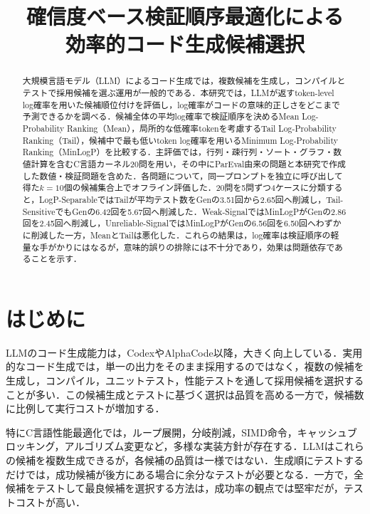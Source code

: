 \documentclass[submit,techrep,noauthor]{ipsj}
\begin{document}
\title{確信度ベース検証順序最適化による\\効率的コード生成候補選択}

\begin{abstract}
大規模言語モデル（LLM）によるコード生成では，複数候補を生成し，コンパイルとテストで採用候補を選ぶ運用が一般的である．本研究では，LLMが返すtoken-level log確率を用いた候補順位付けを評価し，log確率がコードの意味的正しさをどこまで予測できるかを調べる．候補全体の平均log確率で検証順序を決めるMean Log-Probability Ranking（Mean），局所的な低確率tokenを考慮するTail Log-Probability Ranking（Tail），候補中で最も低いtoken log確率を用いるMinimum Log-Probability Ranking（MinLogP）を比較する．主評価では，行列・疎行列・ソート・グラフ・数値計算を含むC言語カーネル20問を用い，その中にParEval由来の問題と本研究で作成した数値・検証問題を含めた．各問題について，同一プロンプトを独立に呼び出して得た$k=10$個の候補集合上でオフライン評価した．20問を5問ずつ4ケースに分類すると，LogP-SeparableではTailが平均テスト数をGenの3.51回から2.65回へ削減し，Tail-SensitiveでもGenの6.42回を5.67回へ削減した．Weak-SignalではMinLogPがGenの2.86回を2.45回へ削減し，Unreliable-SignalではMinLogPがGenの6.56回を6.50回へわずかに削減した一方，MeanとTailは悪化した．これらの結果は，log確率は検証順序の軽量な手がかりにはなるが，意味的誤りの排除には不十分であり，効果は問題依存であることを示す．
\end{abstract}

\maketitle


\section{はじめに}

LLMのコード生成能力は，Codex\cite{chen2021codex}やAlphaCode\cite{li2022alphacode}以降，大きく向上している．実用的なコード生成では，単一の出力をそのまま採用するのではなく，複数の候補を生成し，コンパイル，ユニットテスト，性能テストを通して採用候補を選択することが多い．この候補生成とテストに基づく選択は品質を高める一方で，候補数に比例して実行コストが増加する．

特にC言語性能最適化では，ループ展開，分岐削減，SIMD命令，キャッシュブロッキング，アルゴリズム変更など，多様な実装方針が存在する．LLMはこれらの候補を複数生成できるが，各候補の品質は一様ではない．生成順にテストするだけでは，成功候補が後方にある場合に余分なテストが必要となる．一方で，全候補をテストして最良候補を選択する方法は，成功率の観点では堅牢だが，テストコストが高い．
\end{document}
